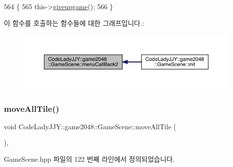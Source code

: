 \begin{DoxyCode}
564                                        \{
565         this->\hyperlink{class_code_lady_j_j_y_1_1game2048_1_1_game_scene_a555636f47220602c6b2b25f6594b9dd0}{giveupgame}();
566     \}
\end{DoxyCode}
이 함수를 호출하는 함수들에 대한 그래프입니다.\+:
\nopagebreak
\begin{figure}[H]
\begin{center}
\leavevmode
\includegraphics[width=350pt]{d1/d76/class_code_lady_j_j_y_1_1game2048_1_1_game_scene_a5fb8ef01d49e87cd898f4d9646dd3034_icgraph}
\end{center}
\end{figure}
\mbox{\label{class_code_lady_j_j_y_1_1game2048_1_1_game_scene_a02da4d987524f8b139bc11a60d94fe6e}} 
\subsubsection{\texorpdfstring{move\+All\+Tile()}{moveAllTile()}}
{\footnotesize\ttfamily void Code\+Lady\+J\+J\+Y\+::game2048\+::\+Game\+Scene\+::move\+All\+Tile (\begin{DoxyParamCaption}{ }\end{DoxyParamCaption})\hspace{0.3cm}{\ttfamily [inline]}, {\ttfamily [private]}}



Game\+Scene.\+hpp 파일의 122 번째 라인에서 정의되었습니다.


